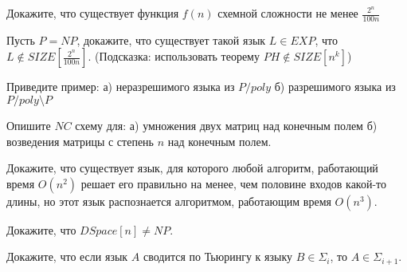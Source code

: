 \begin{ptask}{18}
    Докажите, что существует функция $f(n)$ схемной сложности не менее $\frac{2^n}{100n}$
\end{ptask}

\begin{ptask}{19}
    Пусть $P = NP$, докажите, что существует такой язык $L \in EXP$, что
    $L \notin SIZE[\frac{2^n}{100n}]$. (Подсказка: использовать теорему $PH \notin SIZE[n^k]$)
\end{ptask}

\begin{ptask}{20}
    Приведите пример:
    а) неразрешимого языка из $P/poly$
    б) разрешимого языка из $P/poly \setminus P$
\end{ptask}

\begin{ptask}{21}
	Опишите $NC$ схему для:
    а) умножения двух матриц над конечным полем
    б) возведения матрицы с степень $n$ над конечным полем.
\end{ptask}

\begin{ptask}{23}
    Докажите, что существует язык, для которого любой алгоритм, работающий время
    $O(n^2)$ решает его правильно на менее, чем половине входов какой-то длины, но
    этот язык распознается алгоритмом, работающим время $O(n^3)$.
\end{ptask}

\begin{ptask}{24}
    Докажите, что $DSpace[n] \ne NP$.
\end{ptask}

\begin{ptask}{25}
    Докажите, что если язык $A$ сводится по Тьюрингу к языку $B \in \Sigma_{i}$, то
    $A \in \Sigma_{i + 1}$.
\end{ptask}